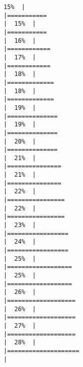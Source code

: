 \documentclass[
]{book}
\begin{document}
\begin{verbatim}
15%  |                                                                              |===========                                                           |  15%  |                                                                              |===========                                                           |  16%  |                                                                              |============                                                          |  17%  |                                                                              |============                                                          |  18%  |                                                                              |=============                                                         |  18%  |                                                                              |=============                                                         |  19%  |                                                                              |==============                                                        |  19%  |                                                                              |==============                                                        |  20%  |                                                                              |==============                                                        |  21%  |                                                                              |===============                                                       |  21%  |                                                                              |===============                                                       |  22%  |                                                                              |================                                                      |  22%  |                                                                              |================                                                      |  23%  |                                                                              |=================                                                     |  24%  |                                                                              |=================                                                     |  25%  |                                                                              |==================                                                    |  25%  |                                                                              |==================                                                    |  26%  |                                                                              |===================                                                   |  26%  |                                                                              |===================                                                   |  27%  |                                                                              |===================                                                   |  28%  |                                                                              |====================                                                  |  
\end{verbatim}
\end{document}
